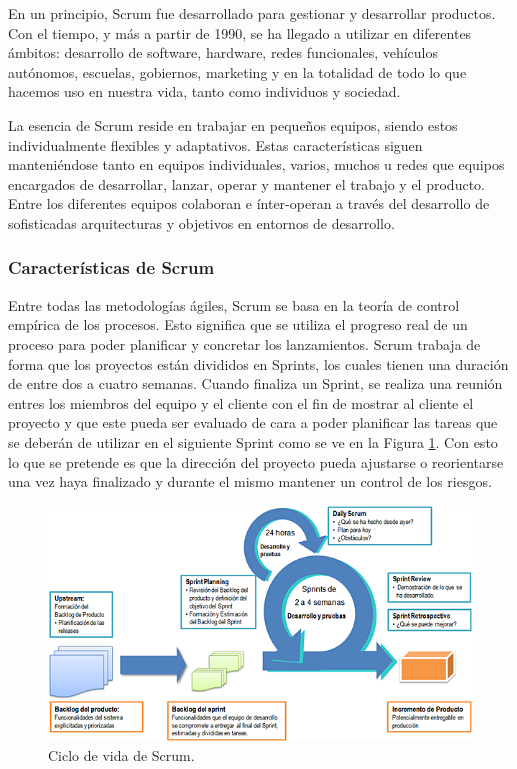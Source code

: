 En un principio, Scrum fue desarrollado para gestionar y desarrollar productos. Con el tiempo, y más a partir de 1990, se ha llegado a utilizar en diferentes ámbitos: desarrollo de software, hardware, redes funcionales, vehículos autónomos, escuelas, gobiernos, marketing y en la totalidad de todo lo que hacemos uso en nuestra vida, tanto como individuos y sociedad.

La esencia de Scrum reside en trabajar en pequeños equipos, siendo estos individualmente flexibles y adaptativos. Estas características siguen manteniéndose tanto en equipos individuales, varios, muchos u redes que equipos encargados de desarrollar, lanzar, operar y mantener el trabajo y el producto. Entre los diferentes equipos colaboran e ínter-operan a través del desarrollo de sofisticadas arquitecturas y objetivos en entornos de desarrollo.

\subsubsection{Características de Scrum}

Entre todas las metodologías ágiles, Scrum se basa en la teoría de control empírica de los procesos. Esto significa que se utiliza el progreso real de un proceso para poder planificar y concretar los lanzamientos. Scrum trabaja de forma que los proyectos están divididos en Sprints, los cuales tienen una duración de entre dos a cuatro semanas. Cuando finaliza un Sprint, se realiza una reunión entres los miembros del equipo y el cliente con el fin de mostrar al cliente el proyecto y que este pueda ser evaluado de cara a poder planificar las tareas que se deberán de utilizar en el siguiente Sprint como se ve en la Figura \ref{fig:scrum}. Con esto lo que se pretende es que la dirección del proyecto pueda ajustarse o reorientarse una vez haya finalizado y durante el mismo mantener un control de los riesgos.

\begin{figure}[h]
	\centering
	\includegraphics[width=1\textwidth]{img/scrum}
	\caption{Ciclo de vida de Scrum.}
	\label{fig:scrum}
\end{figure}

